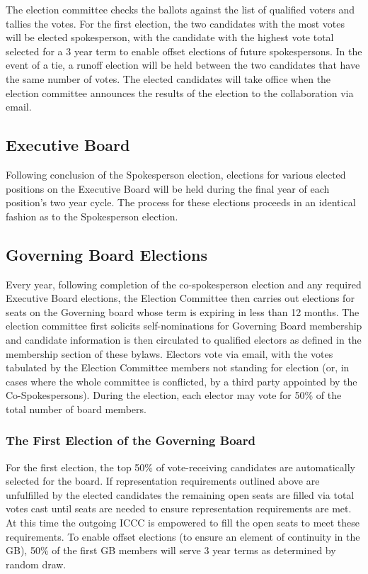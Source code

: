 \documentclass[12pt]{article}
\begin{document}
The election committee checks the ballots against the list of qualified voters and tallies the votes. For the first election, the two candidates with the most votes will be elected spokesperson, with the candidate with the highest vote total selected for a 3 year term to enable offset elections of future spokespersons.  In the event of a tie, a runoff election will be held between the two candidates that have the same number of votes. The elected candidates will take office when the election committee announces the results of the election to the collaboration via email. 

\subsection{Executive Board}
Following conclusion of the Spokesperson election, elections for various elected positions on the Executive Board will be held during the final year of each position's two year cycle. The process for these elections proceeds in an identical fashion as to the Spokesperson election. 

\subsection{Governing Board Elections }

Every year, following completion of the co-spokesperson election and any required Executive Board elections, the Election Committee then carries out elections for seats on the Governing board whose term is expiring in less than 12 months. The election committee first solicits self-nominations for Governing Board membership and candidate information is then circulated to qualified electors as defined in the membership section of these bylaws. Electors vote via email, with the votes tabulated by the Election Committee members not standing for election (or, in cases where the whole committee is conflicted, by a third party appointed by the Co-Spokespersons). During the election, each elector may vote for 50\% of the total number of board members. 


\subsubsection{The First Election of the Governing Board}
For the first election, the top 50\% of vote-receiving candidates are automatically selected for the board. If representation requirements outlined above are unfulfilled by the elected candidates the remaining open seats are filled via total votes cast until seats are needed to ensure representation requirements are met. At this time the outgoing ICCC is empowered to fill the open seats to meet these requirements. 
To enable offset elections (to ensure an element of continuity in the GB), 50\% of the first GB members will serve 3 year terms as determined by random draw. 
\end{document}

